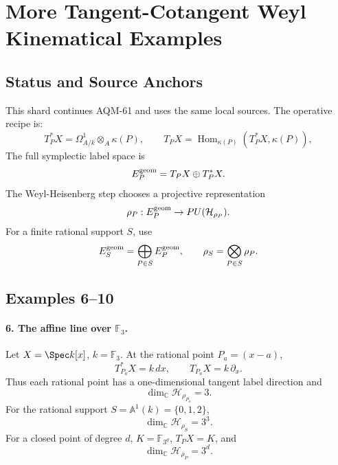 
\section{More Tangent-Cotangent Weyl Kinematical Examples}
\label{sec:tangent-cotangent-weyl-kinematics-more-examples}

\subsection{Status and Source Anchors}

This shard continues AQM-61 and uses the same local sources.  The operative
recipe is:
\[
  T_P^*X=\Omega^1_{A/k}\otimes_A\kappa(P),\qquad
  T_PX=\operatorname{Hom}_{\kappa(P)}(T_P^*X,\kappa(P)),
\]
The full symplectic label space is
\[
  E_P^{\rm geom}=T_PX\oplus T_P^*X.
\]
The Weyl-Heisenberg step chooses a projective representation
\[
  \rho_P:E_P^{\rm geom}\to PU(\mathcal H_{\rho_P}).
\]
For a finite rational support \(S\), use
\[
  E_S^{\rm geom}=\bigoplus_{P\in S}E_P^{\rm geom},\qquad
  \rho_S=\bigotimes_{P\in S}\rho_P .
\]

\subsection{Examples 6--10}

\paragraph{6. The affine line over \(\mathbb F_3\).}
Let \(X=\Spec k[x]\), \(k=\mathbb F_3\).  At the rational point \(P_a=(x-a)\),
\[
  T_{P_a}^*X=k\,dx,\qquad T_{P_a}X=k\,\partial_x.
\]
Thus each rational point has a one-dimensional tangent label direction and
\[
  \dim_{\mathbb C}\mathcal H_{\rho_{P_a}}=3.
\]
For the rational support \(S=\mathbb A^1(k)=\{0,1,2\}\),
\[
  \dim_{\mathbb C}\mathcal H_{\rho_S}=3^3.
\]
For a closed point of degree \(d\), \(K=\mathbb F_{3^d}\), \(T_PX=K\), and
\[
  \dim_{\mathbb C}\mathcal H_{\rho_P}=3^d.
\]

